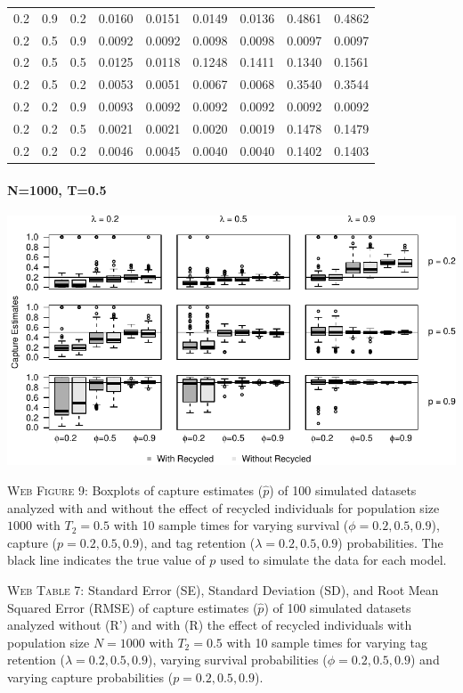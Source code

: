 \documentclass[]{article}
\let\oldparagraph\paragraph
\renewcommand{\paragraph}[1]{\oldparagraph{#1}\mbox{}}
\begin{document}
\begin{table}[ht]
{\begin{tabular}{rrrrrrrrr}
  0.2 & 0.9 & 0.2 & 0.0160 & 0.0151 & 0.0149 & 0.0136 & 0.4861 & 0.4862 \\ 
  0.2 & 0.5 & 0.9 & 0.0092 & 0.0092 & 0.0098 & 0.0098 & 0.0097 & 0.0097 \\ 
  0.2 & 0.5 & 0.5 & 0.0125 & 0.0118 & 0.1248 & 0.1411 & 0.1340 & 0.1561 \\ 
  0.2 & 0.5 & 0.2 & 0.0053 & 0.0051 & 0.0067 & 0.0068 & 0.3540 & 0.3544 \\ 
  0.2 & 0.2 & 0.9 & 0.0093 & 0.0092 & 0.0092 & 0.0092 & 0.0092 & 0.0092 \\ 
  0.2 & 0.2 & 0.5 & 0.0021 & 0.0021 & 0.0020 & 0.0019 & 0.1478 & 0.1479 \\ 
  0.2 & 0.2 & 0.2 & 0.0046 & 0.0045 & 0.0040 & 0.0040 & 0.1402 & 0.1403 \\ 
   \hline
\end{tabular}
}
\endgroup
\end{table}

\newpage

\paragraph{N=1000, T=0.5}\label{n1000-t0.5-1}

\includegraphics{Appendix_BW_files/figure-latex/figure9_capture_GJSTL4-1.pdf}

\textsc{Web Figure 9:} Boxplots of capture estimates (\(\hat{p}\)) of
100 simulated datasets analyzed with and without the effect of recycled
individuals for population size \(1000\) with \(T_2=0.5\) with 10 sample times for varying survival (\(\phi=0.2,0.5,0.9\)), capture
(\(p=0.2,0.5,0.9\)), and tag retention (\(\lambda=0.2,0.5,0.9\))
probabilities. The black line indicates the true value of \(p\) used to
simulate the data for each model.

\textsc{Web Table 7:} Standard Error (SE), Standard Deviation (SD), and
Root Mean Squared Error (RMSE) of capture estimates (\(\hat{p}\)) of 100
simulated datasets analyzed without (R') and with (R) the effect of
recycled individuals with population size \(N=1000\) with \(T_2=0.5\)
with 10 sample times for varying tag retention
(\(\lambda=0.2,0.5,0.9\)), varying survival probabilities
(\(\phi=0.2,0.5,0.9\)) and varying capture probabilities
(\(p=0.2,0.5,0.9\)).
\end{document}
